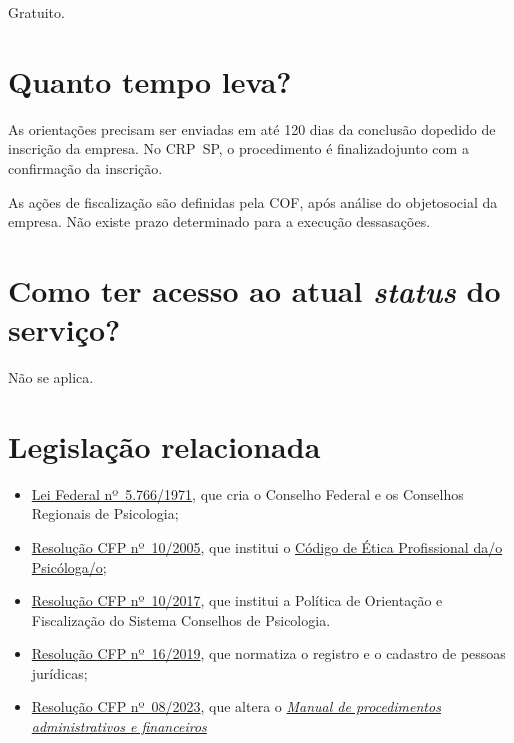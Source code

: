 Gratuito.

\section{Quanto tempo leva?}

As orientações precisam ser enviadas em até 120 dias da conclusão dopedido de inscrição da empresa. No CRP~SP, o procedimento é finalizadojunto com a confirmação da inscrição.

As ações de fiscalização são definidas pela COF, após análise do objetosocial da empresa. Não existe prazo determinado para a execução dessasações.

\section{Como ter acesso ao atual \emph{status} do serviço?}

Não se aplica.

\section{Legislação relacionada}

\begin{itemize}
  \item  \href{http://www.planalto.gov.br/ccivil_03/leis/l5766.htm}{Lei Federal  nº~5.766/1971}, que cria o Conselho Federal e os Conselhos Regionais  de Psicologia;
  \item  \href{https://atosoficiais.com.br/cfp/resolucao-do-exercicio-profissional-n-10-2005-aprova-o-codigo-de-etica-profissional-do-psicologo}{Resolução  CFP nº~10/2005}, que institui o  \href{https://www.crpsp.org/uploads/pagina/289379/2j9LIMPLJ9jFr5YrK57HmAiBWjVMxdbe.pdf}{Código  de Ética Profissional da/o Psicóloga/o};
  \item  \href{https://transparencia.cfp.org.br/wp-content/uploads/sites/10/2017/07/Resolu\%C3\%A7\%C3\%A3o-CFP-010-2017-Politica-de-Orienta\%C3\%A7\%C3\%A3o-e-Fiscaliza\%C3\%A7\%C3\%A3o-dos-Conselhos.pdf}{Resolução  CFP nº~10/2017}, que institui a Política de Orientação e Fiscalização  do Sistema Conselhos de Psicologia.
  \item  \href{https://atosoficiais.com.br/cfp/resolucao-administrativa-financeira-n-16-2019-altera-o-manual-de-procedimentos-administrativo-e-financeiro-do-sistema-conselhos-de-psicologia-anexo-da-resolucao-cfp-n-202018-a-resolucao-cfp-n-03-2007-a-resolucao-cfp-n-16-2019-e-da-outras-providencias}{Resolução  CFP nº~16/2019}, que normatiza o registro e o cadastro de pessoas  jurídicas;
  \item  \href{https://atosoficiais.com.br/cfp/resolucao-administrativa-financeira-n-8-2023-altera-o-manual-de-procedimentos-administrativo-e-financeiro-do-sistema-conselhos-de-psicologia-anexo-da-resolucao-cfp-n-202018-a-resolucao-cfp-n-03-2007-a-resolucao-cfp-n-16-2019-e-da-outras-providencias?origin=instituicao}{Resolução  CFP nº~08/2023}, que altera o  \href{https://transparencia.cfp.org.br/wp-content/uploads/sites/7/2020/05/Manual-de-Procedimentos-Administrativos-e-Financeiro-CFP-RES-20.2018.pdf}{\emph{Manual  de procedimentos administrativos e financeiros}}
\end{itemize}

